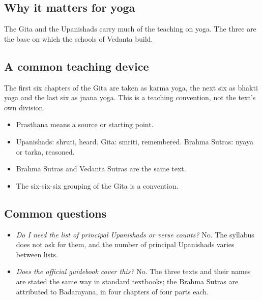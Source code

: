 \subsection*{Why it matters for yoga}
The Gita and the Upanishads carry much of the teaching on yoga. The three are the base on which the schools of Vedanta build.

\subsection*{A common teaching device}
The first six chapters of the Gita are taken as karma yoga, the next six as bhakti yoga and the last six as jnana yoga. This is a teaching convention, not the text's own division.

\begin{recall}
\begin{itemize}
\item Prasthana means a source or starting point.
\item Upanishads: shruti, heard. Gita: smriti, remembered. Brahma Sutras: nyaya or tarka, reasoned.
\item Brahma Sutras and Vedanta Sutras are the same text.
\item The six-six-six grouping of the Gita is a convention.
\end{itemize}
\end{recall}

\subsection*{Common questions}
\begin{itemize}
\item \emph{Do I need the list of principal Upanishads or verse counts?} No. The syllabus does not ask for them, and the number of principal Upanishads varies between lists.
\item \emph{Does the official guidebook cover this?} No. The three texts and their names are stated the same way in standard textbooks; the Brahma Sutras are attributed to Badarayana, in four chapters of four parts each.
\end{itemize}

